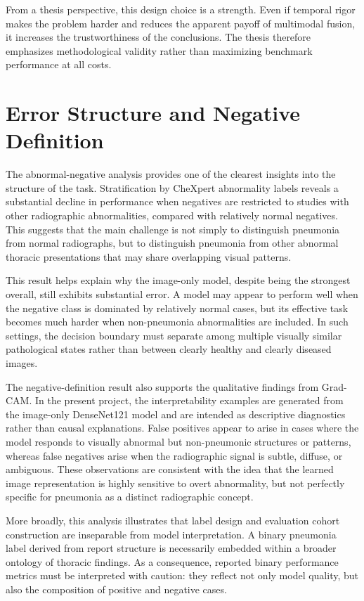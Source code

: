 From a thesis perspective, this design choice is a strength. Even if temporal rigor makes the problem harder and reduces the apparent payoff of multimodal fusion, it increases the trustworthiness of the conclusions. The thesis therefore emphasizes methodological validity rather than maximizing benchmark performance at all costs.

\section{Error Structure and Negative Definition}

The abnormal-negative analysis provides one of the clearest insights into the structure of the task. Stratification by CheXpert abnormality labels reveals a substantial decline in performance when negatives are restricted to studies with other radiographic abnormalities, compared with relatively normal negatives. This suggests that the main challenge is not simply to distinguish pneumonia from normal radiographs, but to distinguish pneumonia from other abnormal thoracic presentations that may share overlapping visual patterns.

This result helps explain why the image-only model, despite being the strongest overall, still exhibits substantial error. A model may appear to perform well when the negative class is dominated by relatively normal cases, but its effective task becomes much harder when non-pneumonia abnormalities are included. In such settings, the decision boundary must separate among multiple visually similar pathological states rather than between clearly healthy and clearly diseased images.

The negative-definition result also supports the qualitative findings from Grad-CAM. In the present project, the interpretability examples are generated from the image-only DenseNet121 model and are intended as descriptive diagnostics rather than causal explanations. False positives appear to arise in cases where the model responds to visually abnormal but non-pneumonic structures or patterns, whereas false negatives arise when the radiographic signal is subtle, diffuse, or ambiguous. These observations are consistent with the idea that the learned image representation is highly sensitive to overt abnormality, but not perfectly specific for pneumonia as a distinct radiographic concept.

More broadly, this analysis illustrates that label design and evaluation cohort construction are inseparable from model interpretation. A binary pneumonia label derived from report structure is necessarily embedded within a broader ontology of thoracic findings. As a consequence, reported binary performance metrics must be interpreted with caution: they reflect not only model quality, but also the composition of positive and negative cases.

